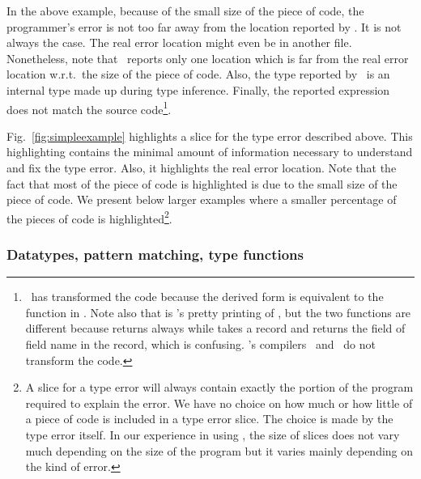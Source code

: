 In the above example, because of the small size of the piece of code,
the programmer's error is not too far away from the location reported
by \SMLNJ.  It is not always the case.  The real error location might
even be in another file.  Nonetheless, note that \SMLNJ\ reports only
one location which is far from the real error location w.r.t.\ the
size of the piece of code.  Also, the type 
reported by \SMLNJ\ is an internal type made up during type inference.
Finally, the reported expression does not match the source
code\footnote{\SMLNJ\ has transformed the code because the derived
  form  is equivalent to the function
   in \SML.  Note also that
   is \SMLNJ's pretty
  printing of , but the two functions are different
  because  returns always
   while  takes a record and
  returns the field of field name  in the record,
  which is confusing.  \SML's compilers \MLTON\ and \POLYML\ do not
  transform the code.}.

Fig.~\ref{fig:simpleexample} highlights a slice for the type error
described above.  This highlighting contains the minimal amount of
information necessary to understand and fix the type error.  Also, it
highlights the real error location.  Note that the fact that most of
the piece of code is highlighted is due to the small size of the piece
of code.  We present below larger examples where a smaller percentage
of the pieces of code is highlighted\footnote{ A slice for a type
  error will always contain exactly the portion of the program
  required to explain the error.  We have no choice on how much or how
  little of a piece of code is included in a type error slice.  The
  choice is made by the type error itself.
  In our experience in using \TES, the size of slices does not vary
  much depending on the size of the program but it varies mainly
  depending on the kind of error.  }.




\subsubsection{Datatypes, pattern matching, type functions}
\label{sec:complexExample}



